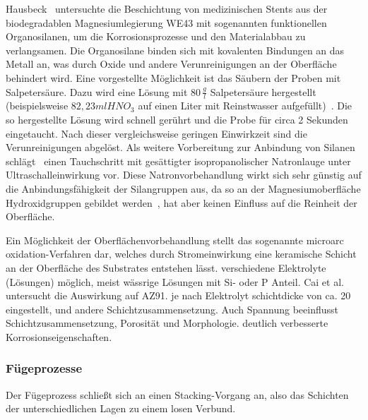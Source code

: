 Hausbeck~\cite{Hausbeck2012} untersuchte die Beschichtung von medizinischen Stents aus der biodegradablen Magnesiumlegierung WE43 mit sogenannten funktionellen Organosilanen, um die Korrosionsprozesse und den Materialabbau zu verlangsamen.
Die Organosilane binden sich mit kovalenten Bindungen an das Metall an, was durch Oxide und andere Verunreinigungen an der Oberfläche behindert wird.
Eine vorgestellte Möglichkeit ist das Säubern der Proben mit Salpetersäure.
Dazu wird eine Lösung mit $80\, \frac{g}{l}$ Salpetersäure hergestellt (beispielsweise $82,23 ml HNO_3$ auf einen Liter mit Reinstwasser aufgefüllt)~.
Die so hergestellte Lösung wird schnell gerührt und die Probe für circa 2 Sekunden eingetaucht.
Nach dieser vergleichsweise geringen Einwirkzeit sind die Verunreinigungen abgelöst.
Als weitere Vorbereitung zur Anbindung von Silanen schlägt~\cite{Hausbeck2012} einen Tauchschritt mit gesättigter isopropanolischer Natronlauge unter Ultraschalleinwirkung vor.
Diese Natronvorbehandlung wirkt sich sehr günstig auf die Anbindungsfähigkeit der Silangruppen aus, da so an der Magnesiumoberfläche Hydroxidgruppen gebildet werden~\cite{Hausbeck2012,Goubaidoulline2004}, hat aber keinen Einfluss auf die Reinheit der Oberfläche.

Ein Möglichkeit der Oberflächenvorbehandlung stellt das sogenannte microarc oxidation-Verfahren dar, welches durch Stromeinwirkung eine keramische Schicht an der Oberfläche des Substrates entstehen lässt.
verschiedene Elektrolyte (Lösungen) möglich, meist wässrige Lösungen mit Si- oder P Anteil.
Cai et al.~\cite{Cai2006} untersucht die Auswirkung auf AZ91.
je nach Elektrolyt schichtdicke von ca. \SI{20}{\mu} eingestellt, und andere Schichtzusammensetzung.
Auch Spannung beeinflusst Schichtzusammensetzung, Porosität und Morphologie.
deutlich verbesserte Korrosionseigenschaften.

\subsubsection{Fügeprozesse}

Der Fügeprozess schließt sich an einen Stacking-Vorgang an, also das Schichten der unterschiedlichen Lagen zu einem losen Verbund.

